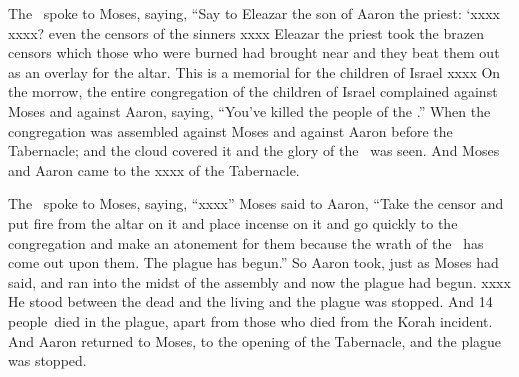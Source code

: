 
\begin{inparaenum}
   The \lord\ spoke to Moses, saying,%
   ``Say to Eleazar the son of Aaron the priest: `xxxx%
   xxxx? even the censors of the sinners xxxx%
   Eleazar the priest took the brazen censors which those who were burned had brought near and they beat them out as an overlay for the altar.%
   This is a memorial for the children of Israel xxxx%
   On the morrow, the entire congregation of the children of Israel complained against Moses and against Aaron, saying, ``You've killed the people of the \lord.''%
   When the congregation was assembled against Moses and against Aaron before the Tabernacle; and the cloud covered it and the glory of the \lord\ was seen.%
   And Moses and Aaron came to the xxxx of the Tabernacle.%
  
   The \lord\ spoke to Moses, saying,%
   ``xxxx''%
   Moses said to Aaron, ``Take the censor and put fire from the altar on it and place incense on it and go quickly to the congregation and make an atonement for them because the wrath of the \lord\ has come out upon them. The plague has begun.''%
   So Aaron took, just as Moses had said, and ran into the midst of the assembly and now the plague had begun. xxxx%
   He stood between the dead and the living and the plague was stopped.%
   And 14 people\understood\ died in the plague, apart from those who died from the Korah incident.%
   And Aaron returned to Moses, to the opening of the Tabernacle, and the plague was stopped.%
  

\end{inparaenum}
